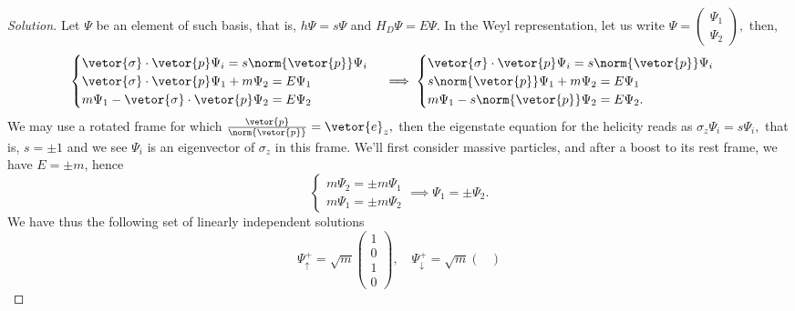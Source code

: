 \begin{proof}[Solution]
   Let \(\Psi\) be an element of such basis, that is, \(h \Psi = s \Psi\) and \(H_D \Psi = E \Psi.\) In the Weyl representation, let us write \(\Psi = \left(\begin{smallmatrix}
       \Psi_1\\
       \Psi_2
   \end{smallmatrix}\right),\) then,
   \begin{equation*}
       \begin{cases}
          \vetor{\sigma}\cdot \vetor{p} \Psi_i = s \norm{\vetor{p}} \Psi_i\\
          \vetor{\sigma} \cdot \vetor{p} \Psi_1 + m \Psi_2 = E \Psi_1\\
          m \Psi_1 - \vetor{\sigma} \cdot \vetor{p} \Psi_2 = E \Psi_2
       \end{cases}
       \implies
       \begin{cases}
          \vetor{\sigma}\cdot \vetor{p} \Psi_i = s \norm{\vetor{p}} \Psi_i\\
          s \norm{\vetor{p}} \Psi_1 + m \Psi_2 = E \Psi_1\\
          m \Psi_1 - s \norm{\vetor{p}} \Psi_2 = E \Psi_2.
       \end{cases}
   \end{equation*}
   We may use a rotated frame for which \(\frac{\vetor{p}}{\norm{\vetor{p}}} = \vetor{e}_z,\) then the eigenstate equation for the helicity reads as \(\sigma_z \Psi_i = s \Psi_i,\) that is, \(s = \pm 1\) and we see \(\Psi_i\) is an eigenvector of \(\sigma_z\) in this frame. We'll first consider massive particles, and after a boost to its rest frame, we have \(E = \pm m\), hence
   \begin{equation*}
      \begin{cases}
         m \Psi_2 = \pm m \Psi_1\\
         m \Psi_1 = \pm m \Psi_2
      \end{cases} \implies \Psi_1 = \pm \Psi_2.
   \end{equation*}
   We have thus the following set of linearly independent solutions
   \begin{equation*}
       \Psi^+_\uparrow = \sqrt{m} \begin{pmatrix}
           1 \\ 0\\1 \\ 0
       \end{pmatrix},
       \quad
       \Psi^+_\downarrow = \sqrt{m} \begin{pmatrix}

\end{pmatrix}
\end{equation*}
\end{proof}
